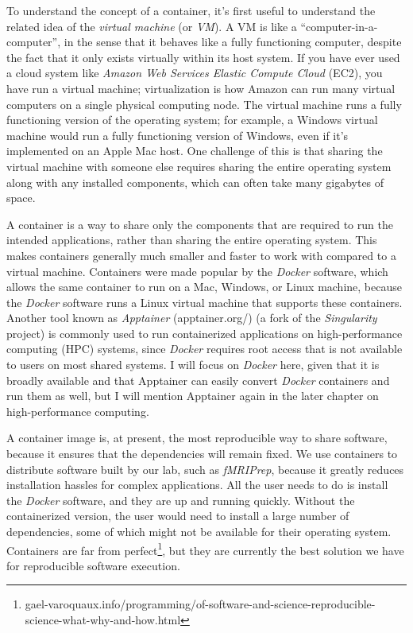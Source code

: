 To understand the concept of a container, it's first useful to understand the related idea of the \textit{virtual machine} (or \textit{VM}).  A VM is like a ``computer-in-a-computer'', in the sense that it behaves like a fully functioning computer, despite the fact that it only exists virtually within its host system. If you have ever used a cloud system like \textit{Amazon Web Services Elastic Compute Cloud} (EC2), you have run a virtual machine; virtualization is how Amazon can run many virtual computers on a single physical computing node. The virtual machine runs a fully functioning version of the operating system; for example, a Windows virtual machine would run a fully functioning version of Windows, even if it's implemented on an Apple Mac host.  One challenge of this is that sharing the virtual machine with someone else requires sharing the entire operating system along with any installed components, which can often take many gigabytes of space.

A container is a way to share only the components that are required to run the intended applications, rather than sharing the entire operating system. This makes containers generally much smaller and faster to work with compared to a virtual machine.  Containers were made popular by the \textit{Docker} software, which allows the same container to run on a Mac, Windows, or Linux machine, because the \textit{Docker} software runs a Linux virtual machine that supports these containers.  Another tool known as \textit{Apptainer} (apptainer.org/) (a fork of the \textit{Singularity} project) is commonly used to run containerized applications on high-performance computing (HPC) systems, since \textit{Docker} requires root access that is not available to users on most shared systems.  I will focus on \textit{Docker} here, given that it is broadly available and that Apptainer can easily convert \textit{Docker} containers and run them as well, but I will mention Apptainer again in the later chapter on high-performance computing.

A container image is, at present, the most reproducible way to share software, because it ensures that the dependencies will remain fixed.  We use containers to distribute software built by our lab, such as \textit{fMRIPrep}, because it greatly reduces installation hassles for complex applications.  All the user needs to do is install the \textit{Docker} software, and they are up and running quickly.  Without the containerized version, the user would need to install a large number of dependencies, some of which might not be available for their operating system.  Containers are far from perfect\footnote{gael-varoquaux.info/programming/of-software-and-science-reproducible-science-what-why-and-how.html}, but they are currently the best solution we have for reproducible software execution.

